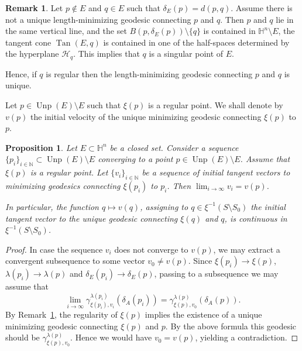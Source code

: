 \documentclass[10pt]{amsart}
\newtheorem{proposition}[theorem]{Proposition}
\theoremstyle{definition}
\newtheorem{remark}[theorem]{Remark}
\theoremstyle{remark}
\numberwithin{equation}{section}
\begin{document}
\begin{remark}
\label{rem:regunique}
Let $p\not\in E$ and $q\in E$ such that $\delta_E(p)=d(p,q)$. Assume there is not a unique length-minimizing geodesic connecting $p$ and $q$. Then $p$ and $q$ lie in the same vertical line, and the set $B(p,\delta_E(p))\setminus\{q\}$ is contained in ${{\mathbb{H}}}^n\setminus E$, the tangent cone $\operatorname{Tan}(E,q)$ is contained in one of the half-spaces determined by the hyperplane ${\mathcal{H}}_q$. This implies that $q$ is a singular point of $E$.

Hence, if $q$ is regular then the length-minimizing geodesic connecting $p$ and $q$ is unique.
\end{remark}

Let $p\in\operatorname{Unp}(E)\setminus E$ such that $\xi(p)$ is a regular point. We shall denote by $v(p)$ the initial velocity of the unique minimizing geodesic connecting $\xi(p)$ to $p$.

\begin{proposition}
\label{prop:vcont}
Let $E\subset{{\mathbb{H}}}^n$ be a closed set. Consider a sequence $\{p_{i}\}_{i\in{{\mathbb{N}}}}\subset\operatorname{Unp}(E)\setminus E$ converging to a point $p\in\operatorname{Unp}(E)\setminus E$.  Assume that $\xi(p)$ is a regular point. Let $\{v_{i}\}_{i\in{{\mathbb{N}}}}$ be a sequence of initial tangent vectors to minimizing geodesics connecting $\xi(p_{i})$ to $p_{i}$. Then $\lim_{i\to\infty}v_{i}=v(p)$.

In particular, the function $q\mapsto v(q)$, assigning to $q\in\xi^{-1}(S\setminus S_{0})$ the initial tangent vector to the unique geodesic connecting $\xi(q)$ and $q$, is continuous in $\xi^{-1}(S\setminus S_{0})$.
\end{proposition}

\begin{proof}
In case the sequence $v_{i}$ does not converge to $v(p)$, we may extract a convergent subsequence to some vector $v_{0}\neq v(p)$. Since $\xi(p_{i})\to\xi(p)$, ${\lambda}(p_{i})\to{\lambda}(p)$ and $\delta_{E}(p_{i})\to \delta_{E}(p)$, passing to a subsequence we may assume that
\[
\lim_{i\to\infty}{\gamma}_{\xi(p_{i}),v_{i}}^{{\lambda}(p_{i})}(\delta_{A}(p_{i}))
={\gamma}_{\xi(p),v_{0}}^{{\lambda}(p)}(\delta_{A}(p)).
\]
By Remark~\ref{rem:regunique}, the regularity of $\xi(p)$ implies the existence of a unique minimizing geodesic connecting $\xi(p)$ and $p$.  By the above formula this geodesic should be ${\gamma}_{\xi(p),v_{0}}^{{\lambda}(p)}$. Hence we would have $v_{0}=v(p)$, yielding a contradiction.
\end{proof}
\end{document}
